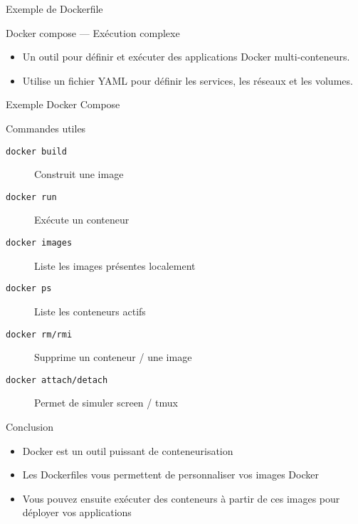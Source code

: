 \begin{frame}{Exemple de Dockerfile}
\end{frame}

\begin{frame}{Docker compose — Exécution complexe}
  \begin{itemize}
    \item Un outil pour définir et exécuter des applications Docker multi-conteneurs.
    \item Utilise un fichier YAML pour définir les services, les réseaux et les volumes.
  \end{itemize}
\end{frame}

\begin{frame}{Exemple Docker Compose}
\end{frame}

\begin{frame}{Commandes utiles}
  \begin{description}
    \item[\texttt{docker build}] Construit une image
    \item[\texttt{docker run}] Exécute un conteneur
    \item[\texttt{docker images}] Liste les images présentes localement
    \item[\texttt{docker ps}] Liste les conteneurs actifs
    \item[\texttt{docker rm/rmi}] Supprime un conteneur / une image
    \item[\texttt{docker attach/detach}] Permet de simuler screen / tmux
  \end{description}
\end{frame}

\begin{frame}{Conclusion}
  \begin{itemize}
    \item Docker est un outil puissant de conteneurisation
    \item Les Dockerfiles vous permettent de personnaliser vos images Docker
    \item Vous pouvez ensuite exécuter des conteneurs à partir de ces images pour déployer vos applications
  \end{itemize}
\end{frame}
